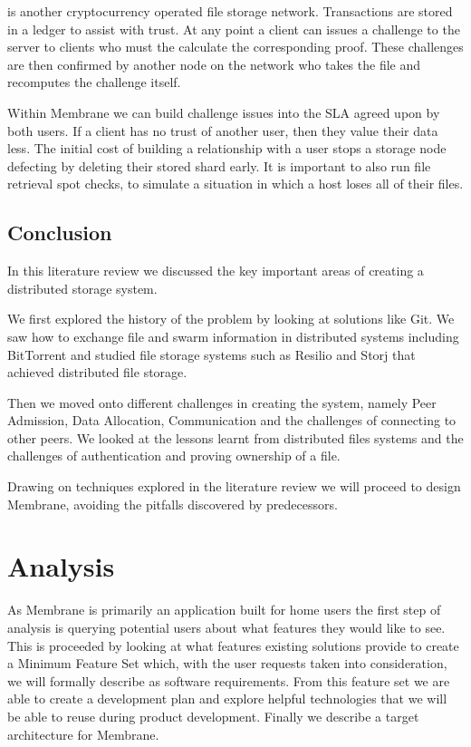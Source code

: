\documentclass[11pt, a4paper, twocolumn, twoside]{report}
\begin{document}
\cite{filecoin2014filecoin} is another cryptocurrency operated file storage network. Transactions are stored in a ledger to assist with trust. At any point a client can issues a challenge to the server to clients who must the calculate the corresponding proof. These challenges are then confirmed by another node on the network who takes the file and recomputes the challenge itself.

Within Membrane we can build challenge issues into the SLA agreed upon by both users. If a client has no trust of another user, then they value their data less. The initial cost of building a relationship with a user stops a storage node defecting by deleting their stored shard early. It is important to also run file retrieval spot checks, to simulate a situation in which a host loses all of their files.

\section{Conclusion}
In this literature review we discussed the key important areas of creating a distributed storage system.

We first explored the history of the problem by looking at solutions like Git. We saw how to exchange file and swarm information in distributed systems including BitTorrent and studied file storage systems such as Resilio and Storj that achieved distributed file storage.

Then we moved onto different challenges in creating the system, namely Peer Admission, Data Allocation, Communication and the challenges of connecting to other peers. We looked at the lessons learnt from distributed files systems and the challenges of authentication and proving ownership of a file.

Drawing on techniques explored in the literature review we will proceed to design Membrane, avoiding the pitfalls discovered by predecessors.

\chapter{Analysis}

As Membrane is primarily an application built for home users the first step of analysis is querying potential users about what features they would like to see. This is proceeded by looking at what features existing solutions provide to create a Minimum Feature Set which, with the user requests taken into consideration, we will formally describe as software requirements. From this feature set we are able to create a development plan and explore helpful technologies that we will be able to reuse during product development. Finally we describe a target architecture for Membrane.
\end{document}
